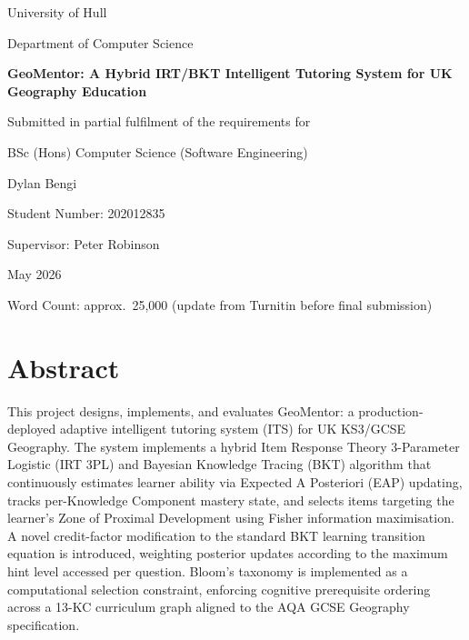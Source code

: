 \documentclass[12pt,a4paper]{report}
\begin{document}
\begin{titlepage}
  \centering
  \vspace*{2cm}
  {\Large University of Hull \par}
  {\large Department of Computer Science \par}
  \vspace{1.5cm}
  {\huge\bfseries GeoMentor: A Hybrid IRT/BKT Intelligent Tutoring System for UK Geography Education \par}
  \vspace{1.5cm}
  {\large Submitted in partial fulfilment of the requirements for\par}
  {\large BSc (Hons) Computer Science (Software Engineering) \par}
  \vspace{2cm}
  {\Large Dylan Bengi \par}
  \vspace{0.5cm}
  {\large Student Number: 202012835 \par}
  {\large Supervisor: Peter Robinson \par}
  \vspace{0.5cm}
  {\large May 2026 \par}
  \vfill
  {\small Word Count: approx.\ 25{,}000 (update from Turnitin before final submission) \par}
\end{titlepage}


\chapter*{Abstract}

This project designs, implements, and evaluates GeoMentor: a production-deployed
adaptive intelligent tutoring system (ITS) for UK KS3/GCSE Geography. The system
implements a hybrid Item Response Theory 3-Parameter Logistic (IRT 3PL) and
Bayesian Knowledge Tracing (BKT) algorithm that continuously estimates learner
ability via Expected A Posteriori (EAP) updating, tracks per-Knowledge Component
mastery state, and selects items targeting the learner's Zone of Proximal
Development using Fisher information maximisation. A novel credit-factor
modification to the standard BKT learning transition equation is introduced,
weighting posterior updates according to the maximum hint level accessed per
question. Bloom's taxonomy is implemented as a computational selection
constraint, enforcing cognitive prerequisite ordering across a 13-KC curriculum
graph aligned to the AQA GCSE Geography specification.
\end{document}
